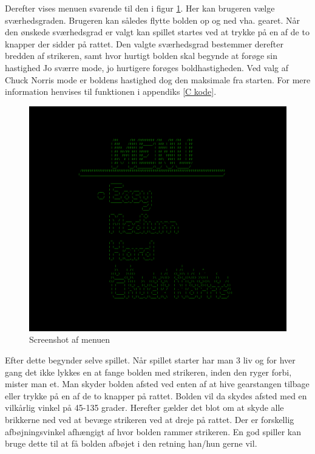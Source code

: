 Derefter vises menuen svarende til den i figur \ref{fig:menu_2}. Her kan brugeren vælge sværhedsgraden. Brugeren kan således flytte bolden op og ned vha. gearet. Når den ønskede sværhedsgrad er valgt kan spillet startes ved at trykke på en af de to knapper der sidder på rattet. Den valgte sværhedsgrad bestemmer derefter bredden af strikeren, samt hvor hurtigt bolden skal begynde at forøge sin hastighed Jo sværre mode, jo hurtigere forøges boldhastigheden. Ved valg af Chuck Norris mode er boldens hastighed dog den maksimale fra starten. For mere information henvises til funktionen  i appendiks \ref{C kode}. \\

\begin{figure}[h!]
\centering
\includegraphics[scale=0.25]{figs/screenshots/menu_crop.png}
\caption{Screenshot af menuen}
\label{fig:menu_2}
\end{figure}

Efter dette begynder selve spillet. Når spillet starter har man 3 liv og for hver gang det ikke lykkes en at fange bolden med strikeren, inden den ryger forbi, mister man et. Man skyder bolden afsted ved enten af at hive gearstangen tilbage eller trykke på en af de to knapper på rattet. Bolden vil da skydes afsted med en vilkårlig vinkel på 45-135 grader. Herefter gælder det blot om at skyde alle brikkerne ned ved at bevæge strikeren ved at dreje på rattet. Der er forskellig afbøjningsvinkel afhængigt af hvor bolden rammer strikeren. En god spiller kan bruge dette til at få bolden afbøjet i den retning han/hun gerne vil.\\


